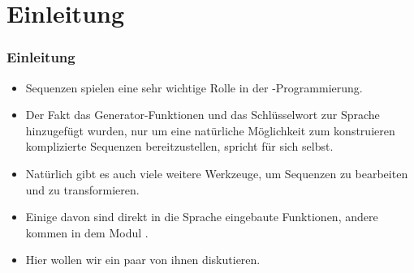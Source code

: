 \documentclass[aspectratio=169,mathserif,notheorems]{beamer}%
\subtitle{40.~Operationen für Iteratoren}%
\begin{document}
%
%
\startPresentation%
%
\section{Einleitung}%
\begin{frame}%
\frametitle{Einleitung}%
\begin{itemize}%
\item Sequenzen spielen eine sehr wichtige Rolle in der \python-Programmierung.%
%
\item<2-> Der Fakt das Generator-Funktionen und das Schlüsselwort  zur Sprache hinzugefügt wurden, nur um eine natürliche Möglichkeit zum konstruieren komplizierte Sequenzen bereitzustellen, spricht für sich selbst\cite{PEP255}.%
%
\item<3-> Natürlich gibt es auch viele weitere Werkzeuge, um Sequenzen zu bearbeiten und zu transformieren.%
%
\item<4-> Einige davon sind direkt in die Sprache eingebaute Funktionen, andere kommen in dem Modul \cite{PSF:P3D:TPSL:IFCIFEL}.%
%
\item<5-> Hier wollen wir ein paar von ihnen diskutieren.%
\end{itemize}
\end{frame}%
%
\end{document}
